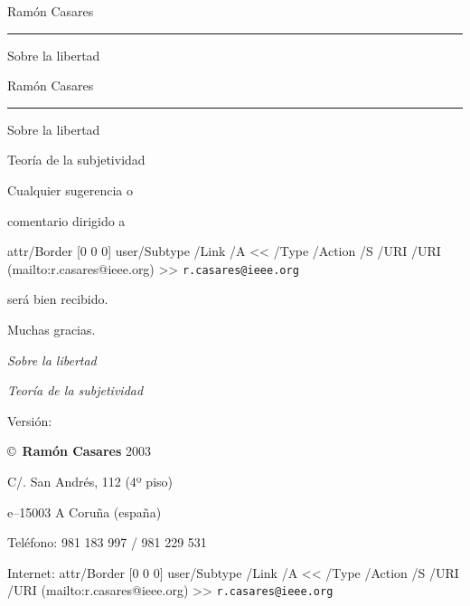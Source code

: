 

\ifx\pdfliteral\undefined\else
 \begingroup\corkfont
 \endgroup
\fi


\pdflabel {}

\centerline{\fontone Ramón Casares}
\vskip1pc
\hrule height 1pt
\vskip1.5pc
\centerline{\fontzero Sobre la libertad}

\vfill\break %

\null

\vfill\break %

\centerline{\fontone Ramón Casares}
\vskip1pc
\hrule height 1pt
\vskip1.5pc
\centerline{\fontzero Sobre la libertad}
\vskip1pc
\centerline{\fontone Teoría de la subjetividad}

\vfill\break %

\null \vfill

 Cualquier sugerencia o\par comentario dirigido a\par
 \indent\pdfcode \pdfstartlink attr{/Border [0 0 0]}
   user{/Subtype /Link /A << /Type /Action
    /S /URI /URI (mailto:r.casares@ieee.org) >>}\pdfendcode
  {\tt r.casares@ieee.org}\pdfcode \pdfendlink \pdfendcode\par
 será bien recibido.\par
 Muchas gracias.

\vglue 2pc

 \def\smallcaps#1{{\sc\lowercase{#1}}}

 {\sl Sobre la libertad}\par
 {\sl Teoría de la subjetividad}\par
 Versión: \todayiso \par
 \copyright\ {\bf Ramón Casares} 2003\par
 C/. San Andrés, 112 (4º piso)\par
 \smallcaps E--15003 A Coruña (\smallcaps{ESPAÑA})\par
 Teléfono: 981 183 997 / 981 229 531\par
 Internet: \pdfcode \pdfstartlink attr{/Border [0 0 0]}
   user{/Subtype /Link /A << /Type /Action
    /S /URI /URI (mailto:r.casares@ieee.org) >>}\pdfendcode
  {\tt r.casares@ieee.org}\pdfcode \pdfendlink \pdfendcode \par

\break %


\null
\vfil
\rightline{[Dedicatoria]}
\vfil
\rightline{[Agradecimientos]}
\vfil
\break %

\null\vfill\break %

\endinput

